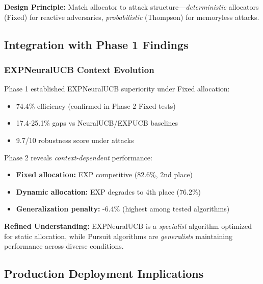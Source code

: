 \documentclass[11pt,a4paper]{article}
\begin{document}
\textbf{Design Principle:} Match allocator to attack structure—\textit{deterministic} allocators (Fixed) for reactive adversaries, \textit{probabilistic} (Thompson) for memoryless attacks.

\subsection{Integration with Phase 1 Findings}

\subsubsection{EXPNeuralUCB Context Evolution}

Phase 1 established EXPNeuralUCB superiority under Fixed allocation:
\begin{itemize}
    \item 74.4\% efficiency (confirmed in Phase 2 Fixed tests)
    \item 17.4-25.1\% gaps vs NeuralUCB/EXPUCB baselines
    \item 9.7/10 robustness score under attacks
\end{itemize}

Phase 2 reveals \textit{context-dependent} performance:
\begin{itemize}
    \item \textbf{Fixed allocation:} EXP competitive (82.6\%, 2nd place)
    \item \textbf{Dynamic allocation:} EXP degrades to 4th place (76.2\%)
    \item \textbf{Generalization penalty:} -6.4\% (highest among tested algorithms)
\end{itemize}

\textbf{Refined Understanding:} EXPNeuralUCB is a \textit{specialist} algorithm optimized for static allocation, while Pursuit algorithms are \textit{generalists} maintaining performance across diverse conditions.

\subsection{Production Deployment Implications}
\end{document}
